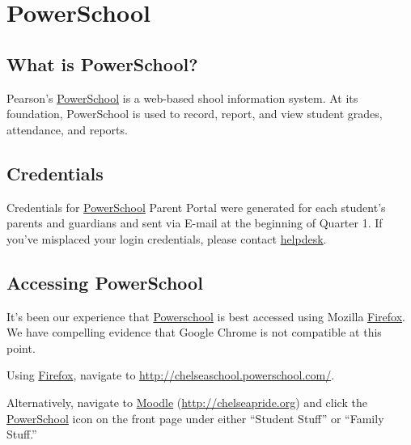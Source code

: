 \documentclass[letterpaper,10pt,english]{sphinxmanual}
\begin{document}

\chapter{PowerSchool}
\label{powerschool::doc}\label{powerschool:powerschool}\label{powerschool:index-0}

\section{What is PowerSchool?}
\label{powerschool:what-is-powerschool}
Pearson's \href{http://chelseaschool.powerschool.com/}{PowerSchool} is a web-based shool information system. At its foundation, PowerSchool is used to record, report, and view student grades, attendance, and reports.


\section{Credentials}
\label{powerschool:credentials}
Credentials for \href{http://chelseaschool.powerschool.com/}{PowerSchool} Parent Portal were generated for each student's parents and guardians and sent via E-mail at the beginning of Quarter 1. If you've misplaced your login credentials, please contact \href{http://chelseapride.org/helpdesk}{helpdesk}.


\section{Accessing PowerSchool}
\label{powerschool:accessing-powerschool}
It's been our experience that \href{http://chelseaschool.powerschool.com/}{Powerschool} is best accessed using Mozilla \href{http://www.mozilla.org/en-US/firefox/new/}{Firefox}. We have compelling evidence that Google Chrome is not compatible at this point.

Using \href{http://www.mozilla.org/en-US/firefox/new/}{Firefox}, navigate to \href{http://chelseaschool.powerschool.com/}{http://chelseaschool.powerschool.com/}.

Alternatively, navigate to \href{http://chelseapride.org}{Moodle} (\href{http://chelseapride.org}{http://chelseapride.org}) and click the \href{http://chelseaschool.powerschool.com/}{PowerSchool} icon on the front page under either ``Student Stuff'' or ``Family Stuff.''
\end{document}
